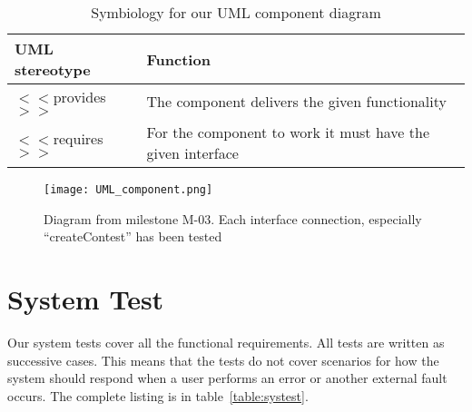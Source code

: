 \begin{longtable}{|l|p{}|}
    \caption{Symbiology for our UML component diagram} \label{table:component} \\
    \hline
    \textbf{UML stereotype} & \textbf{Function}\\
    \hline

    $<<$provides$>>$ & The component delivers the given functionality \\
    \hline

    $<<$requires$>>$& For the component to work it must have the given interface\\
        \hline
\end{longtable}

\begin{figure}[h!]
    \centering
    \texttt{[image: UML\_component.png]}
    \caption{Diagram from milestone M-03. Each interface connection, especially
    ``createContest'' has been tested}
    \label{fig:componentDiagram}
\end{figure}

\pagebreak
\newpage
\section{System Test}
Our system tests cover all the functional requirements. All tests are
written as successive cases. This means that the tests do not cover
scenarios for how the system should respond when a user performs an
error or another external fault occurs. The complete listing is in
table~\ref{table:systest}.

